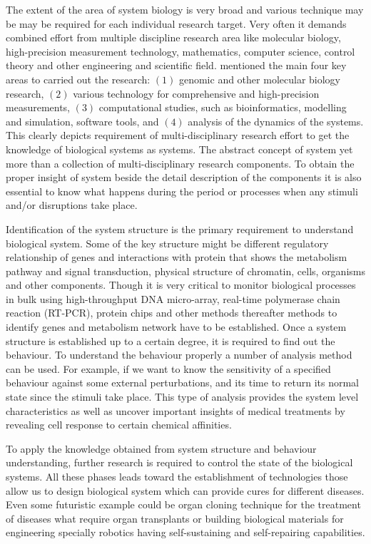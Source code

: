 The extent of the area of system biology is very broad and various technique may be may be required for each individual research target. Very often it demands combined effort from multiple discipline research area like molecular biology, high-precision measurement technology, mathematics, computer science, control theory and other engineering and scientific field. \cite{Kitano:2002} mentioned the main four key areas to carried out the research: $(1)$ genomic and other molecular biology research, $(2)$ various technology for comprehensive and high-precision measurements, $(3)$ computational studies, such as bioinformatics, modelling and simulation, software tools, and $(4)$ analysis of the dynamics of the systems. This clearly depicts requirement of multi-disciplinary research effort to get the knowledge of biological systems as systems. The abstract concept of system yet more than a collection of multi-disciplinary research components. To obtain the proper insight of system beside the detail description of the components it is also essential to know what happens during the period or processes when any stimuli and/or disruptions take place.

Identification of the system structure is the primary requirement to understand biological system. Some of the key structure might be different regulatory relationship of genes and interactions with protein that shows the metabolism pathway and signal transduction, physical structure of chromatin, cells, organisms and other components. Though it is very critical to monitor biological processes in bulk using high-throughput DNA micro-array, real-time polymerase chain reaction (RT-PCR), protein chips and other methods thereafter methods to identify genes and metabolism network have to be established. Once a system structure is established up to a certain degree, it is required to find out the behaviour. To understand the behaviour properly a number of analysis method can be used. For example, if we want
to know the sensitivity of a specified behaviour against some external perturbations, and its time to return its normal state since the stimuli take place. This type of analysis provides the system level characteristics as well as uncover important insights of medical treatments by revealing cell response to certain chemical affinities. 

To apply the knowledge obtained from system structure and behaviour understanding, further research is required to control the state of the biological systems. All these phases leads toward the establishment of technologies those allow us to design biological system which can provide cures for different diseases. Even some futuristic example could be organ cloning technique for the treatment of diseases what require organ transplants or building biological materials for engineering specially robotics having self-sustaining and self-repairing capabilities.

